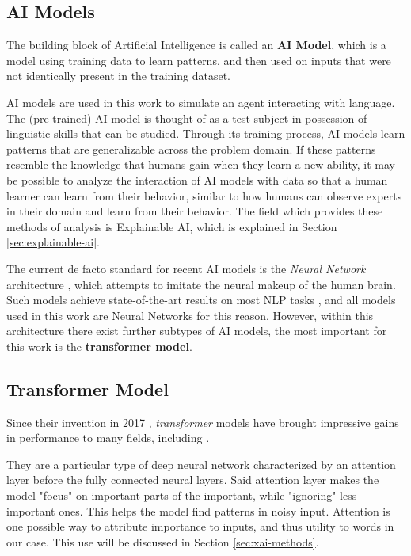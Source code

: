 \subsection{AI Models}
The building block of Artificial Intelligence is called an \textbf{AI Model}, which is a model using training data to learn patterns, and then used on inputs that were not identically present in the training dataset.

AI models are used in this work to simulate an agent interacting with language.
The (pre-trained) AI model is thought of as a test subject in possession of linguistic skills that can be studied.
Through its training process, AI models learn patterns that are generalizable across the problem domain.
If these patterns resemble the knowledge that humans gain when they learn a new ability, it may be possible to analyze the interaction of AI models with data so that a human learner can learn from their behavior, similar to how humans can observe experts in their domain and learn from their behavior.
The field which provides these methods of analysis is Explainable AI, which is explained in Section \ref{sec:explainable-ai}.

The current de facto standard for recent AI models is the \textit{Neural Network} architecture \cite{jurafskySpeechLanguageProcessing2025}, which attempts to imitate the neural makeup of the human brain.
Such models achieve state-of-the-art results on most NLP tasks , and all models used in this work are Neural Networks for this reason.
However, within this architecture there exist further subtypes of AI models, the most important for this work is the \textbf{transformer model}.


\subsection{Transformer Model} \label{sec:transformer}
Since their invention in 2017 \cite{vaswani2017attention}, \textit{transformer} models have brought impressive gains in performance to many fields, including \NLP.

They are a particular type of deep neural network characterized by an attention layer before the fully connected neural layers.
Said attention layer makes the model "focus" on important parts of the important, while "ignoring" less important ones.
This helps the model find patterns in noisy input.
Attention is one possible way to attribute importance to inputs, and thus utility to words in our case.
This use will be discussed in Section \ref{sec:xai-methods}.

